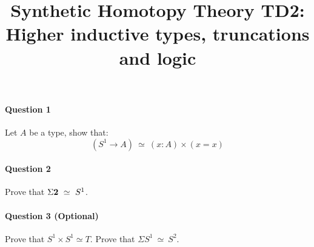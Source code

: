 \documentclass{article}[6pt]%
\title{Synthetic Homotopy Theory TD2: Higher inductive types, truncations and logic}
\renewcommand{\r}{\rightarrow}
\newcommand{\two}{{\bf 2}}
\begin{document}
\maketitle

\begin{Exercise}[title={Higher inductive types}]

\paragraph{Question 1} Let $A$ be a type, show that: 
\[(S^1\r A)\ \simeq\ (x:A)\times (x=x)\]

\paragraph{Question 2} Prove that $\Sigma \two \ \simeq \ S^1$. 

\paragraph{Question 3 (Optional)} Prove that $S^1\times S^1 \simeq T$. Prove that $\Sigma S^1 \ \simeq \ S^2$.
\end{Exercise}


\end{document}
